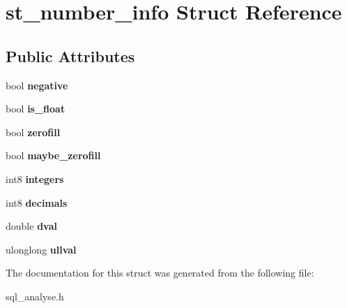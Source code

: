 \hypertarget{structst__number__info}{}\section{st\+\_\+number\+\_\+info Struct Reference}
\label{structst__number__info}
\subsection*{Public Attributes}
\begin{DoxyCompactItemize}
\item 
\mbox{\label{structst__number__info_a84c016184930779ac33daa56f6369cc1}} 
bool {\bfseries negative}
\item 
\mbox{\label{structst__number__info_a4203712da832a1ccc5db93c5cba69baf}} 
bool {\bfseries is\+\_\+float}
\item 
\mbox{\label{structst__number__info_a6f95761c6964446064d2cd444ab36828}} 
bool {\bfseries zerofill}
\item 
\mbox{\label{structst__number__info_aadb8f6b281db194ca8ad929d6dcb5850}} 
bool {\bfseries maybe\+\_\+zerofill}
\item 
\mbox{\label{structst__number__info_afe56a9e9add8b7c1ce1ea503a15be961}} 
int8 {\bfseries integers}
\item 
\mbox{\label{structst__number__info_a466f37e2645e2165c4a72a0cc12465aa}} 
int8 {\bfseries decimals}
\item 
\mbox{\label{structst__number__info_a0ce385bb2edc2a5d118dffe406144bf7}} 
double {\bfseries dval}
\item 
\mbox{\label{structst__number__info_ab091fdddde484107202e92e060d2cee1}} 
ulonglong {\bfseries ullval}
\end{DoxyCompactItemize}


The documentation for this struct was generated from the following file\+:\begin{DoxyCompactItemize}
\item 
sql\+\_\+analyse.\+h\end{DoxyCompactItemize}
